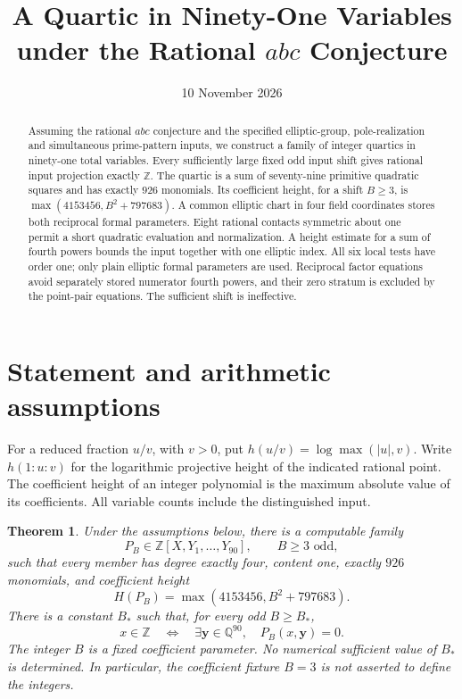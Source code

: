 \documentclass[11pt,a4paper]{article}
\title{A Quartic in Ninety-One Variables under the Rational $abc$ Conjecture}
\author{}\date{10 November 2026}
\newtheorem{theorem}{Theorem}[section]
\newcommand{\Q}{\mathbb Q}\newcommand{\Z}{\mathbb Z}
\begin{document}
\maketitle
\begin{abstract}
Assuming the rational $abc$ conjecture and the specified elliptic-group,
pole-realization and simultaneous prime-pattern inputs, we construct a
family of integer quartics in ninety-one total variables. Every
sufficiently large fixed odd input shift gives rational input projection
exactly $\Z$. The quartic is a sum of seventy-nine primitive quadratic
squares and has exactly $926$ monomials. Its coefficient height, for a
shift $B\ge3$, is $\max(4153456,B^2+797683)$. A common elliptic chart in four field coordinates stores both reciprocal
formal parameters. Eight rational contacts symmetric about one permit a short quadratic evaluation and normalization.
A height estimate for a sum of fourth powers bounds the input together
with one elliptic index. All six local tests have order one; only plain
elliptic formal parameters are used. Reciprocal factor equations
avoid separately stored numerator fourth powers, and their zero stratum
is excluded by the point-pair equations. The sufficient shift is ineffective.
\end{abstract}

\section{Statement and arithmetic assumptions}

For a reduced fraction $u/v$, with $v>0$, put
$h(u/v)=\log\max(|u|,v)$. Write $h(1:u:v)$ for the logarithmic
projective height of the indicated rational point. The coefficient height
of an integer polynomial is the maximum absolute value of its coefficients.
All variable counts include the distinguished input.

\begin{theorem}\label{thm:main}
Under the assumptions below, there is a computable family
\[
 P_B\in\Z[X,Y_1,\ldots,Y_{90}],\qquad B\ge3\text{ odd},
\]
such that every member has degree exactly four, content one, exactly
$926$ monomials, and coefficient height
\[
 H(P_B)=\max(4153456,B^2+797683).
\]
There is a constant $B_*$ such that, for every odd $B\ge B_*$,
\[
 x\in\Z\quad\Longleftrightarrow\quad
 \exists\boldsymbol y\in\Q^{90},\quad P_B(x,\boldsymbol y)=0.
\]
The integer $B$ is a fixed coefficient parameter. No numerical sufficient
value of $B_*$ is determined. In particular, the coefficient fixture
$B=3$ is not asserted to define the integers.
\end{theorem}
\end{document}
